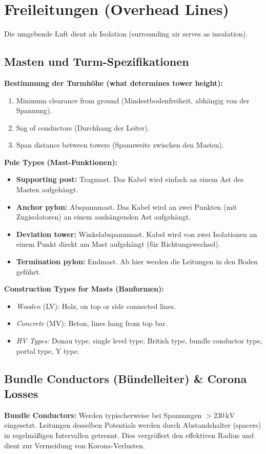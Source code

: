 \documentclass[11pt, a4paper]{article}
\begin{document}
\section{Freileitungen (Overhead Lines)}
Die umgebende Luft dient als Isolation (surrounding air serves as insulation).

\subsection{Masten und Turm-Spezifikationen}
\textbf{Bestimmung der Turmhöhe (what determines tower height):}
\begin{enumerate}
    \item Minimum clearance from ground (Mindestbodenfreiheit, abhängig von der Spannung).
    \item Sag of conductors (Durchhang der Leiter).
    \item Span distance between towers (Spannweite zwischen den Masten).
\end{enumerate}

\textbf{Pole Types (Mast-Funktionen):}
\begin{itemize}
    \item \textbf{Supporting post:} Tragmast. Das Kabel wird einfach an einem Ast des Masten aufgehängt.
    \item \textbf{Anchor pylon:} Abspannmast. Das Kabel wird an zwei Punkten (mit Zugisolatoren) an einem aushängenden Ast aufgehängt.
    \item \textbf{Deviation tower:} Winkelabspannmast. Kabel wird von zwei Isolationen an einem Punkt direkt am Mast aufgehängt (für Richtungswechsel).
    \item \textbf{Termination pylon:} Endmast. Ab hier werden die Leitungen in den Boden geführt.
\end{itemize}

\textbf{Construction Types for Masts (Bauformen):}
\begin{itemize}
    \item \textit{Wooden} (LV): Holz, on top or side connected lines.
    \item \textit{Concrete} (MV): Beton, lines hang from top bar.
    \item \textit{HV Types:} Donau type, single level type, British type, bundle conductor type, portal type, Y type.
\end{itemize}

\subsection{Bundle Conductors (Bündelleiter) \& Corona Losses}
\textbf{Bundle Conductors:}
Werden typischerweise bei Spannungen $> 230\,\text{kV}$ eingesetzt. Leitungen desselben Potentials werden durch Abstandshalter (spacers) in regelmäßigen Intervallen getrennt. Dies vergrößert den effektiven Radius und dient zur Vermeidung von Korona-Verlusten.
\end{document}

